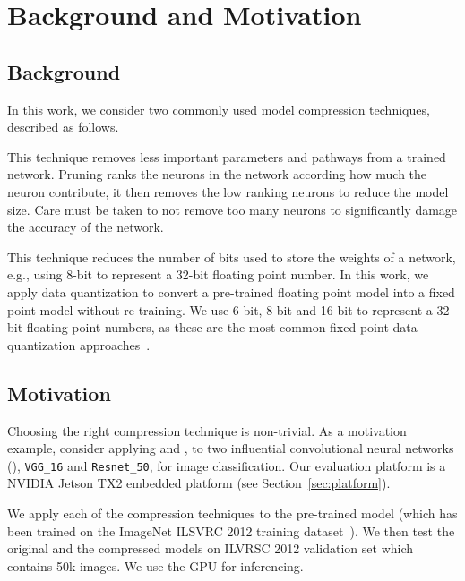 
\section{Background and Motivation}
\subsection{Background}
In this work, we consider two commonly used model compression techniques, described as follows.

 This technique removes less important parameters and pathways from a trained network. Pruning ranks the neurons in
the network according how much the neuron contribute, it then removes the low ranking neurons to reduce the model size. Care must be taken
to not remove too many neurons to significantly damage the accuracy of the network.

 This technique reduces the number of bits used to store the weights of a network, e.g., using 8-bit to
represent a 32-bit floating point number. In this work, we apply data quantization to convert a pre-trained floating point model into a
fixed point model without re-training. We use 6-bit, 8-bit and 16-bit to represent a 32-bit floating point numbers, as these are the most
common fixed point data quantization approaches~\cite{pacq}.



\subsection{Motivation}
Choosing the right compression technique is non-trivial. As a motivation example, consider applying \pruning and \dquantization, to two
influential convolutional neural networks (\CNN), \texttt{VGG\_16} 	and \texttt{Resnet\_50}, for image classification. Our evaluation
platform is a NVIDIA Jetson TX2 embedded platform (see Section~\ref{sec:platform}).

 We apply each of the compression techniques to the pre-trained model (which has been trained on the ImageNet ILSVRC
2012 training dataset~\cite{imagenet2012}). We then test the original and the compressed models on ILVRSC 2012 validation set which
contains 50k images. We use the GPU for inferencing.

